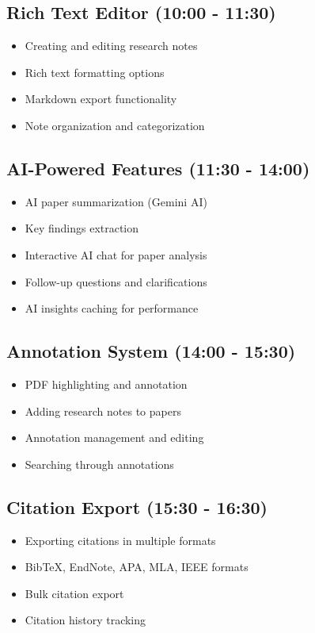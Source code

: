 \subsection{Rich Text Editor (10:00 - 11:30)}
\begin{itemize}[leftmargin=*]
    \item Creating and editing research notes
    \item Rich text formatting options
    \item Markdown export functionality
    \item Note organization and categorization
\end{itemize}

\subsection{AI-Powered Features (11:30 - 14:00)}
\begin{itemize}[leftmargin=*]
    \item AI paper summarization (Gemini AI)
    \item Key findings extraction
    \item Interactive AI chat for paper analysis
    \item Follow-up questions and clarifications
    \item AI insights caching for performance
\end{itemize}

\subsection{Annotation System (14:00 - 15:30)}
\begin{itemize}[leftmargin=*]
    \item PDF highlighting and annotation
    \item Adding research notes to papers
    \item Annotation management and editing
    \item Searching through annotations
\end{itemize}

\subsection{Citation Export (15:30 - 16:30)}
\begin{itemize}[leftmargin=*]
    \item Exporting citations in multiple formats
    \item BibTeX, EndNote, APA, MLA, IEEE formats
    \item Bulk citation export
    \item Citation history tracking
\end{itemize}

